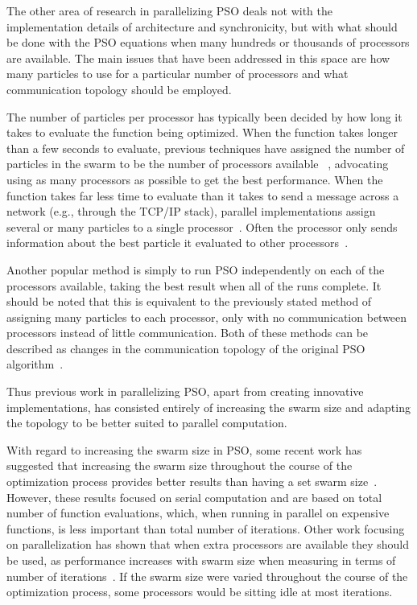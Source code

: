 \documentclass[smallcondensed]{svjour3}
\begin{document}
The other area of research in parallelizing PSO deals not with the
implementation details of architecture and synchronicity, but with what should
be done with the PSO equations when many hundreds or thousands of processors
are available.  The main issues that have been addressed in this space are how
many particles to use for a particular number of processors and what
communication topology should be employed.

The number of particles per processor has typically been decided by how long it
takes to evaluate the function being optimized.  When the function takes longer
than a few seconds to evaluate, previous techniques have assigned the number of
particles in the swarm to be the number of processors available~%
\citep{jin-2005-pso-antenna-designs,mcnabb-2009-large-particle-swarms},
advocating using as many processors as possible to get the best performance.
When the function takes far less time to evaluate than it takes to send a
message across a network (e.g., through the TCP/IP stack), parallel
implementations assign several or many particles to a single
processor~\citep{chu-2006-intelligent-parallel-pso,
chang-2005-parallel-pso-with-communication-strategies}.  Often the processor
only sends information about the best particle it evaluated to other
processors~\citep{belal-2004-parallel-models-for-pso}.

Another popular method is simply to run PSO independently on each of the
processors available, taking the best result when all of the runs complete.  It
should be noted that this is equivalent to the previously stated method of
assigning many particles to each processor, only with no communication between
processors instead of little communication.  Both of these methods can be
described as changes in the communication topology of the original PSO
algorithm~\citep{mcnabb-2009-large-particle-swarms}.

Thus previous work in parallelizing PSO, apart from creating innovative
implementations, has consisted entirely of increasing the swarm size and
adapting the topology to be better suited to parallel computation.

With regard to increasing the swarm size in PSO, some recent work has suggested
that increasing the swarm size throughout the course of the optimization
process provides better results than having a set swarm
size~\citep{hsieh-2009-efficient-population-utilization-for-pso,
montes-de-oca-2010-incremental-social-learning-pso}.  However, these results
focused on serial computation and are based on total number of function
evaluations, which, when running in parallel on expensive functions, is less
important than total number of iterations.  Other work focusing on
parallelization has shown that when extra processors are available they should
be used, as performance increases with swarm size when measuring in terms of
number of iterations~\citep{mcnabb-2009-large-particle-swarms,
jin-2005-pso-antenna-designs}.  If the swarm size were varied throughout the
course of the optimization process, some processors would be sitting idle at
most iterations.
\end{document}
